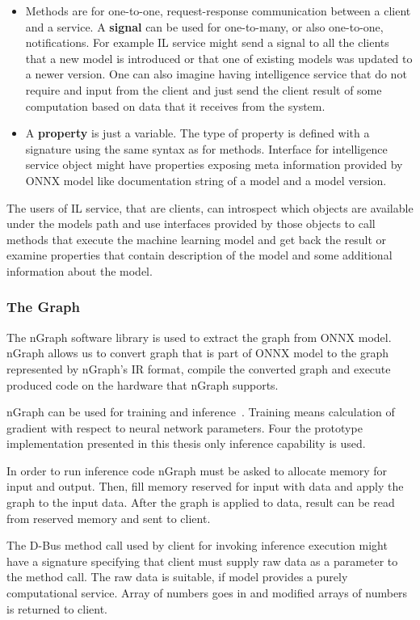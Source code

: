 \documentclass[english, 12pt, a4paper, elec, utf8, online]{aaltothesis}
\begin{document}
\begin{itemize}
\item
Methods are for one-to-one, request-response communication between a client and a service. A \textbf{signal} can be used for one-to-many, or also one-to-one, notifications. For example IL service might send a signal to all the clients that a new model is introduced or that one of existing models was updated to a newer version. One can also imagine having intelligence service that do not require and input from the client and just send the client result of some computation based on data that it receives from the system. 
\item 
A \textbf{property} is just a variable. The type of property is defined with a signature using the same syntax as for methods. Interface for intelligence service object might have properties exposing meta information provided by ONNX model like documentation string of a model and a model version.        
\end{itemize}

The users of IL service, that are clients, can introspect which objects are available under the models path and use interfaces provided by those objects to call methods that execute the machine learning model and get back the result or examine properties that contain description of the model and some additional information about the model.       


\subsubsection{The Graph}
The nGraph software library is used to extract the graph from ONNX model. nGraph allows us to convert graph that is part of ONNX model to the graph represented by nGraph's  IR format, compile the converted graph and execute produced code on the hardware that nGraph supports. 

nGraph can be used for training and inference~\cite{cyphers2018intel}. Training means calculation of gradient with respect to neural network parameters. Four the prototype implementation presented in this thesis only inference capability is used. 

In order to run inference code nGraph must be asked to allocate memory for input and output. Then, fill memory reserved for input with data and apply the graph to the input data. After the graph is applied to data, result can be read from reserved memory and sent to client. 

The D-Bus method call used by client for invoking inference execution might have a signature specifying that client must supply raw data as a parameter to the method call. The raw data is suitable, if model provides a purely computational service. Array of numbers goes in and modified arrays of numbers is returned to client. 
\end{document}
